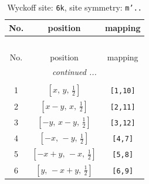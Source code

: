 \documentclass[fleqn,8pt]{jsarticle}
\begin{document}
\renewcommand{\arraystretch}{1.2}
\begin{longtable}{ccc}
\caption{Wyckoff site: {\tt 6k}, site symmetry: {\tt m'..}}
 \\
 \hline \hline
No. & position & mapping \\ \hline \endfirsthead

\multicolumn{2}{l}{\tablename\ \thetable{}} \\
 \hline \hline
No. & position & mapping \\ \hline \endhead

 \hline \hline
\multicolumn{2}{r}{\footnotesize\it continued ...} \\ \endfoot

 \hline \hline
\multicolumn{2}{r}{} \\ \endlastfoot

1 & $\left[ x,\, y,\, \frac{1}{2} \right]$ & {\tt [1,10]} \\ \hline
2 & $\left[ x - y,\, x,\, \frac{1}{2} \right]$ & {\tt [2,11]} \\ \hline
3 & $\left[ - y,\, x - y,\, \frac{1}{2} \right]$ & {\tt [3,12]} \\ \hline
4 & $\left[ - x,\, - y,\, \frac{1}{2} \right]$ & {\tt [4,7]} \\ \hline
5 & $\left[ - x + y,\, - x,\, \frac{1}{2} \right]$ & {\tt [5,8]} \\ \hline
6 & $\left[ y,\, - x + y,\, \frac{1}{2} \right]$ & {\tt [6,9]} \\
\end{longtable}
\renewcommand{\arraystretch}{1.2}
\end{document}
